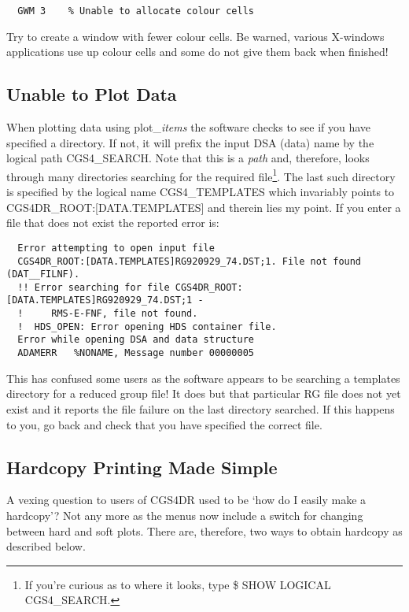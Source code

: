 {\begin{verbatim}
  GWM 3    % Unable to allocate colour cells
\end{verbatim}

Try to create a window with fewer colour cells. 
Be warned, various X-windows applications use up colour 
cells and some do not give them back when finished!

\subsection{Unable to Plot Data}
\label{unable_to_plot_data}

When plotting data using {\sf plot\_{\em items}} the software checks to
see if you have specified a directory. If not, it will prefix the 
input DSA (data) name by the logical path CGS4\_SEARCH. Note that this is a
{\em path} and, therefore, looks through many directories searching for
the required file\footnote{If you're curious as to where it looks, type
{\sf \$ SHOW LOGICAL CGS4\_SEARCH}.}.  The last such directory is specified 
by the logical name CGS4\_TEMPLATES which invariably points to 
CGS4DR\_ROOT:[DATA.TEMPLATES] and therein lies my point. If you enter 
a file that does not exist the reported error is:

\begin{verbatim}
  Error attempting to open input file
  CGS4DR_ROOT:[DATA.TEMPLATES]RG920929_74.DST;1. File not found (DAT__FILNF).
  !! Error searching for file CGS4DR_ROOT:[DATA.TEMPLATES]RG920929_74.DST;1 -
  !     RMS-E-FNF, file not found.
  !  HDS_OPEN: Error opening HDS container file.
  Error while opening DSA and data structure
  ADAMERR   %NONAME, Message number 00000005
\end{verbatim}

This has confused some users as the software appears to be searching a 
templates directory for a reduced group file! It does but that particular
RG file does not yet exist and it reports the file failure on the last 
directory searched. If this happens to you, go back and check that you
have specified the correct file.

\subsection{Hardcopy Printing Made Simple}
\label{hardcopy_printing_made_simple}

A vexing question to users of CGS4DR used to be `how do I easily make a 
hardcopy'? Not any more as the menus now include a switch for changing between
hard and soft plots. There are, therefore, two ways to obtain hardcopy as
described below.

}
